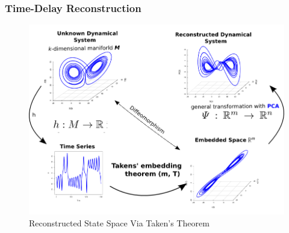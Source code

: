 \documentclass{beamer}
\theoremstyle{definition}
\begin{document}
\begin{frame}
\frametitle{Time-Delay Reconstruction}
\vspace{-0.5cm}
\begin{figure}
 \includegraphics[scale=.4]{takens_theorem_v2} 
\vspace{-0.6cm}
 \caption{Reconstructed State Space Via Taken's Theorem}
\end{figure} 
\end{frame}
\end{document}
